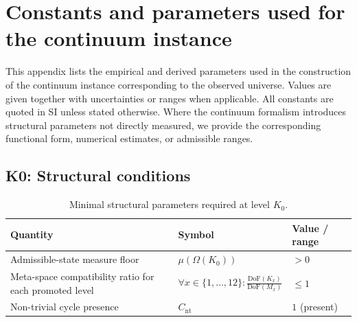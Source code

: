 
\section{Constants and parameters used for the continuum instance}
\label{app:synthesis-constants-and-parameters}

This appendix lists the empirical and derived parameters used in the construction
of the continuum instance corresponding to the observed universe.
Values are given together with uncertainties or ranges when applicable.
All constants are quoted in SI unless stated otherwise.
Where the continuum formalism introduces structural parameters not directly
measured, we provide the corresponding functional form, numerical estimates,
or admissible ranges.



\subsection*{K0: Structural conditions}

\begin{table}[htbp]
  \centering
  \caption{Minimal structural parameters required at level \(K_0\).}
  \label{tab:k0-structural-parameters}
\begin{tabular}{@{}L{0.44\textwidth}L{0.16\textwidth}L{0.23\textwidth}@{}}
    \hline
    Quantity & Symbol & Value / range \\
    \hline
    Admissible-state measure floor & \(\mu(\Omega(K_0))\)
        & \(> 0\) \\
    Meta-space compatibility ratio for each promoted level & \(\forall x \in \{1,\dots,12\}: \frac{\mathrm{DoF}(K_x)}{\mathrm{DoF}(M_x)}\)
        & \(\leq 1\) \\
    Non-trivial cycle presence & \(C_{\mathrm{nt}}\)
        & \(1\) (present) \\
    \hline
\end{tabular}
\end{table}


